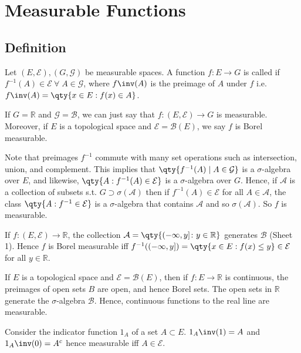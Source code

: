 \section{Measurable Functions}
\subsection{Definition}
\begin{definition}[Measurable]
	Let $(E, \mathcal E), (G, \mathcal G)$ be measurable spaces.
	A function $f \colon E \to G$ is called  if $f^{-1}(A) \in \mathcal E \ \forall \; A \in \mathcal{G}$, where $f\inv(A)$ is the preimage of $A$ under $f$ i.e. $f\inv(A) = \qty{x \in E : f(x) \in A}$.
\end{definition}

If $G = \mathbb R$ and $\mathcal G = \mathcal B$, we can just say that $f \colon (E, \mathcal E) \to G$ is measurable.
Moreover, if $E$ is a topological space and $\mathcal E = \mathcal B(E)$, we say $f$ is Borel measurable.

Note that preimages $f^{-1}$ commute with many set operations such as intersection, union, and complement.
This implies that $\qty{f^{-1}(A) \mid A \in \mathcal G}$ is a $\sigma$-algebra over $E$, and likewise, $\qty{A : f^{-1}(A) \in \mathcal E}$ is a $\sigma$-algebra over $G$.
Hence, if $\mathcal A$ is a collection of subsets s.t. $G \supset \sigma(\mathcal{A})$ then if $f^{-1}(A) \in \mathcal E$ for all $A \in \mathcal A$, the class $\qty{A : f^{-1} \in \mathcal E}$ is a $\sigma$-algebra that contains $\mathcal A$ and so $\sigma(\mathcal{A})$.
So $f$ is measurable.

If $f \colon (E, \mathcal E) \to \mathbb R$, the collection $\mathcal A = \qty{(-\infty,y] \colon y \in \mathbb R}$ generates $\mathcal B$ (Sheet 1).
Hence $f$ is Borel measurable iff $f^{-1}((-\infty,y]) = \qty{x \in E : f(x) \leq y} \in \mathcal E$ for all $y \in \mathbb R$.

If $E$ is a topological space and $\mathcal E = \mathcal B(E)$, then if $f \colon E \to \mathbb R$ is continuous, the preimages of open sets $B$ are open, and hence Borel sets.
The open sets in $\mathbb R$ generate the $\sigma$-algebra $\mathcal B$.
Hence, continuous functions to the real line are measurable.

\begin{example}
	Consider the indicator function $1_A$ of a set $A \subset E$. $1_A\inv(1) = A$ and $1_A\inv(0) = A^c$ hence measurable iff $A \in \mathcal E$.
\end{example}

